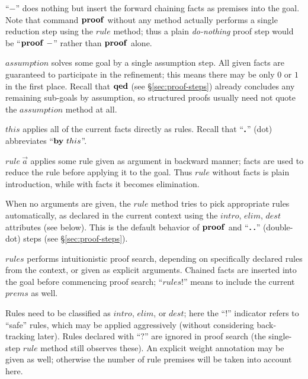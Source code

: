 \begin{descr}
  
\item [``$-$''] does nothing but insert the forward chaining facts as premises
  into the goal.  Note that command ${\mathord{\mathbf{proof}}}$ without any method actually
  performs a single reduction step using the $rule$ method; thus a plain
  \emph{do-nothing} proof step would be ``$\PROOF{-}$'' rather than
  ${\mathord{\mathbf{proof}}}$ alone.
  
\item [$assumption$] solves some goal by a single assumption step.  All given
  facts are guaranteed to participate in the refinement; this means there may
  be only $0$ or $1$ in the first place.  Recall that ${\mathord{\mathbf{qed}}}$ (see
  \S\ref{sec:proof-steps}) already concludes any remaining sub-goals by
  assumption, so structured proofs usually need not quote the $assumption$
  method at all.
  
\item [$this$] applies all of the current facts directly as rules.  Recall
  that ``$\textbf{.}$'' (dot) abbreviates ``$\BY{this}$''.
  
\item [$rule~\vec a$] applies some rule given as argument in backward manner;
  facts are used to reduce the rule before applying it to the goal.  Thus
  $rule$ without facts is plain introduction, while with facts it becomes
  elimination.
  
  When no arguments are given, the $rule$ method tries to pick appropriate
  rules automatically, as declared in the current context using the $intro$,
  $elim$, $dest$ attributes (see below).  This is the default behavior of
  ${\mathord{\mathbf{proof}}}$ and ``$\textbf{.\,.}$'' (double-dot) steps (see
  \S\ref{sec:proof-steps}).
  
\item [$rules$] performs intuitionistic proof search, depending on
  specifically declared rules from the context, or given as explicit
  arguments.  Chained facts are inserted into the goal before commencing proof
  search; ``$rules!$'' means to include the current $prems$ as well.
  
  Rules need to be classified as $intro$, $elim$, or $dest$; here the ``$!$''
  indicator refers to ``safe'' rules, which may be applied aggressively
  (without considering back-tracking later).  Rules declared with ``$?$'' are
  ignored in proof search (the single-step $rule$ method still observes
  these).  An explicit weight annotation may be given as well; otherwise the
  number of rule premises will be taken into account here.
  

\end{descr}
